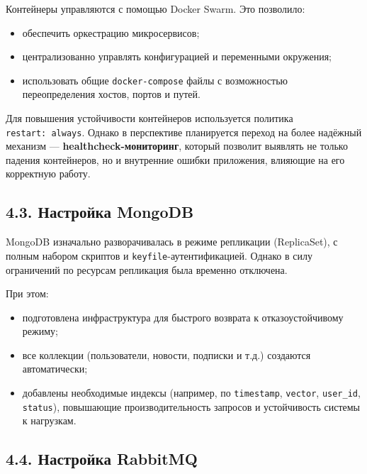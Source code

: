 Контейнеры управляются с помощью Docker Swarm. Это позволило:

\begin{itemize}
\tightlist
\item
  обеспечить оркестрацию микросервисов;\\
\item
  централизованно управлять конфигурацией и переменными окружения;\\
\item
  использовать общие \texttt{docker-compose} файлы с возможностью
  переопределения хостов, портов и путей.
\end{itemize}

Для повышения устойчивости контейнеров используется политика
\texttt{restart:\ always}. Однако в перспективе планируется переход на
более надёжный механизм --- \textbf{healthcheck-мониторинг}, который
позволит выявлять не только падения контейнеров, но и внутренние ошибки
приложения, влияющие на его корректную работу.

\hypertarget{ux43dux430ux441ux442ux440ux43eux439ux43aux430-mongodb}{%
\subsection{4.3. Настройка
MongoDB}\label{ux43dux430ux441ux442ux440ux43eux439ux43aux430-mongodb}}

MongoDB изначально разворачивалась в режиме репликации (ReplicaSet), с
полным набором скриптов и \texttt{keyfile}-аутентификацией. Однако в
силу ограничений по ресурсам репликация была временно отключена.

При этом:

\begin{itemize}
\tightlist
\item
  подготовлена инфраструктура для быстрого возврата к отказоустойчивому
  режиму;\\
\item
  все коллекции (пользователи, новости, подписки и т.д.) создаются
  автоматически;\\
\item
  добавлены необходимые индексы (например, по \texttt{timestamp},
  \texttt{vector}, \texttt{user\_id}, \texttt{status}), повышающие
  производительность запросов и устойчивость системы к нагрузкам.
\end{itemize}

\hypertarget{ux43dux430ux441ux442ux440ux43eux439ux43aux430-rabbitmq}{%
\subsection{4.4. Настройка
RabbitMQ}\label{ux43dux430ux441ux442ux440ux43eux439ux43aux430-rabbitmq}}

